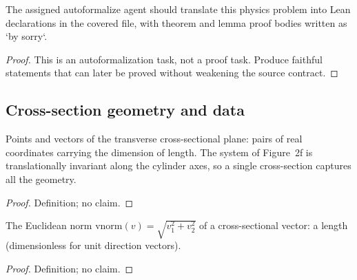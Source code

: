 \begin{theorem}
\label{thm:physics:IPhO_2026_2_B_1:target}
The assigned autoformalize agent should translate this physics problem into Lean declarations in the covered file, with theorem and lemma proof bodies written as `by sorry`.
\end{theorem}
\begin{proof}
This is an autoformalization task, not a proof task. Produce faithful statements that can later be proved without weakening the source contract.
\end{proof}

\subsection*{Cross-section geometry and data}

\begin{definition}
\label{def:IPhO2026Problems_problem_IPhO_2026_2_B_1:Vec}
Points and vectors of the transverse cross-sectional plane: pairs of real
coordinates carrying the dimension of length.  The system of Figure~2f is
translationally invariant along the cylinder axes, so a single cross-section
captures all the geometry.
\end{definition}
\begin{proof}
Definition; no claim.
\end{proof}

\begin{definition}
\label{def:IPhO2026Problems_problem_IPhO_2026_2_B_1:vnorm}
The Euclidean norm $\mathrm{vnorm}(v) = \sqrt{v_1^2 + v_2^2}$ of a
cross-sectional vector: a length (dimensionless for unit direction vectors).
\end{definition}
\begin{proof}
Definition; no claim.
\end{proof}

